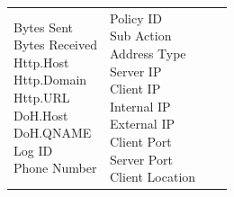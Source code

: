 \begin{description}
\begin{longtable}{p{}|p{}|p{}|p{}}
{                                                                                    Bytes Sent\\
                                                                                    Bytes Received\\
                                                                                    Http.Host\\
                                                                                    Http.Domain\\
                                                                                    Http.URL\\
                                                                                    DoH.Host\\
                                                                                    DoH.QNAME\\
                                                                                    Log ID\\
                                                                                    Phone Number}  & \tabincell{l}{Policy ID\\
                                                                                                            Sub Action\\
                                                                                                            Address Type\\
                                                                                                            Server IP\\
                                                                                                            Client IP\\
                                                                                                            Internal IP\\
                                                                                                            External IP\\
                                                                                                            Client Port\\
                                                                                                            Server Port\\
                                                                                                            Client Location\\
}
\end{longtable}
\end{description}
